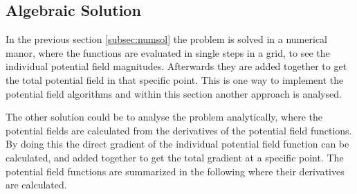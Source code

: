 \subsection{Algebraic Solution}
In the previous section \ref{subsec:numsol} the problem is solved in a numerical manor, where the functions are evaluated in single steps in a grid, to see the individual potential field magnitudes. Afterwards they are added together to get the total potential field in that specific point. This is one way to implement the potential field algorithms and within this section another approach is analysed.

The other solution could be to analyse the problem analytically, where the potential fields are calculated from the derivatives of the potential field functions. By doing this the direct gradient of the individual potential field function can be calculated, and added together to get the total gradient at a specific point. The potential field functions are summarized in the following where their derivatives are calculated.

